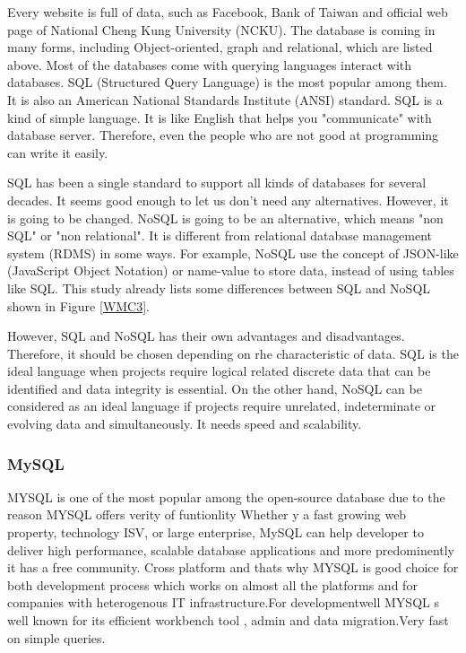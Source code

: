 Every website is full of data, such as Facebook, Bank of Taiwan and official web page of National Cheng Kung University (NCKU).
The database is coming in many forms, including Object-oriented, graph and relational, which are listed above.
Most of the databases come with querying languages interact with databases.
SQL (Structured Query Language) is the most popular among them.
It is also an American National Standards Institute (ANSI) standard.
SQL is a kind of simple language.
It is like English that helps you "communicate" with database server.
Therefore, even the people who are not good at programming can write it easily.


SQL has been a single standard to support all kinds of databases for several decades.
It seems good enough to let us don't need any alternatives.
However, it is going to be changed.
NoSQL is going to be an alternative, which means "non SQL" or "non relational".
It is different from relational database management system (RDMS) in some ways.
For example, NoSQL use the concept of JSON-like (JavaScript Object Notation) or name-value to store data, instead of using tables like SQL.
This study already lists some differences between SQL and NoSQL shown in Figure \ref{WMC3}.


However, SQL and NoSQL has their own advantages and disadvantages.
Therefore, it should be chosen depending on rhe characteristic of data.
SQL is the ideal language when projects require logical related discrete data that can be identified and data integrity is essential.
On the other hand, NoSQL can be considered as an ideal language if projects require unrelated, indeterminate or evolving data and simultaneously. 
It needs speed and scalability.

\subsubsection{MySQL}
MYSQL is one of the  most popular among the open-source database due to the reason  MYSQL offers verity of funtionlity Whether y a fast growing web property, technology ISV, or large enterprise, MySQL can help developer to deliver high performance, scalable database applications and more predominently it has a free community. Cross platform and thats why MYSQL is  good choice for  both development process which works on almost all the  platforms and for companies with heterogenous IT infrastructure.For  developmentwell MYSQL s well known  for  its efficient workbench tool , admin and data migration.Very fast on simple queries.

